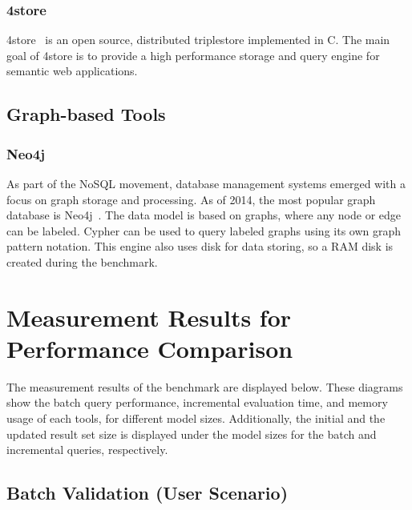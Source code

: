 \subsubsection{4store}
4store~\cite{harris20094store} is an open source, distributed triplestore implemented in C. The main goal of 4store is to provide a high performance storage and query engine for semantic web applications. 

\subsection{Graph-based Tools}

\subsubsection{Neo4j}
As part of the NoSQL movement, database management systems emerged with a focus on graph storage and processing. As of 2014, the most popular graph database is 
Neo4j~\cite{neo4j}. The data model is based on graphs, where any node or edge can be labeled. Cypher can be used to query labeled graphs using its own graph pattern notation. This engine also uses disk for data storing, so a RAM disk is created during the benchmark.

\section{Measurement Results for Performance Comparison}
\label{sec:results}

The measurement results of the benchmark are displayed below. These diagrams show the batch query performance, incremental evaluation time, and memory usage of each tools, for different model sizes. Additionally, the initial and the updated result set size is displayed under the model sizes for the batch and incremental queries, respectively.



\subsection{Batch Validation (User Scenario)}

